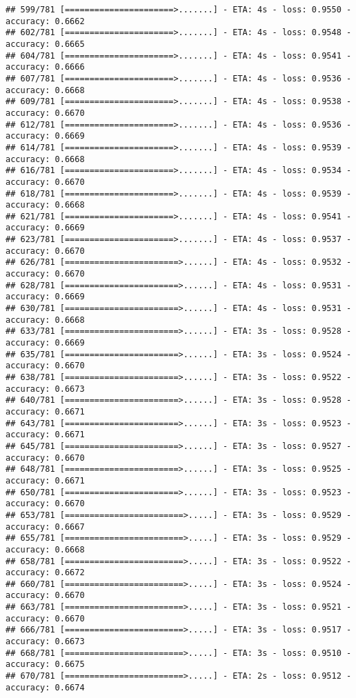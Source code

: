 \documentclass[
]{article}
\begin{document}
\begin{verbatim}
## 599/781 [======================>.......] - ETA: 4s - loss: 0.9550 - accuracy: 0.6662
## 602/781 [======================>.......] - ETA: 4s - loss: 0.9548 - accuracy: 0.6665
## 604/781 [======================>.......] - ETA: 4s - loss: 0.9541 - accuracy: 0.6666
## 607/781 [======================>.......] - ETA: 4s - loss: 0.9536 - accuracy: 0.6668
## 609/781 [======================>.......] - ETA: 4s - loss: 0.9538 - accuracy: 0.6670
## 612/781 [======================>.......] - ETA: 4s - loss: 0.9536 - accuracy: 0.6669
## 614/781 [======================>.......] - ETA: 4s - loss: 0.9539 - accuracy: 0.6668
## 616/781 [======================>.......] - ETA: 4s - loss: 0.9534 - accuracy: 0.6670
## 618/781 [======================>.......] - ETA: 4s - loss: 0.9539 - accuracy: 0.6668
## 621/781 [======================>.......] - ETA: 4s - loss: 0.9541 - accuracy: 0.6669
## 623/781 [======================>.......] - ETA: 4s - loss: 0.9537 - accuracy: 0.6670
## 626/781 [=======================>......] - ETA: 4s - loss: 0.9532 - accuracy: 0.6670
## 628/781 [=======================>......] - ETA: 4s - loss: 0.9531 - accuracy: 0.6669
## 630/781 [=======================>......] - ETA: 4s - loss: 0.9531 - accuracy: 0.6668
## 633/781 [=======================>......] - ETA: 3s - loss: 0.9528 - accuracy: 0.6669
## 635/781 [=======================>......] - ETA: 3s - loss: 0.9524 - accuracy: 0.6670
## 638/781 [=======================>......] - ETA: 3s - loss: 0.9522 - accuracy: 0.6673
## 640/781 [=======================>......] - ETA: 3s - loss: 0.9528 - accuracy: 0.6671
## 643/781 [=======================>......] - ETA: 3s - loss: 0.9523 - accuracy: 0.6671
## 645/781 [=======================>......] - ETA: 3s - loss: 0.9527 - accuracy: 0.6670
## 648/781 [=======================>......] - ETA: 3s - loss: 0.9525 - accuracy: 0.6671
## 650/781 [=======================>......] - ETA: 3s - loss: 0.9523 - accuracy: 0.6670
## 653/781 [========================>.....] - ETA: 3s - loss: 0.9529 - accuracy: 0.6667
## 655/781 [========================>.....] - ETA: 3s - loss: 0.9529 - accuracy: 0.6668
## 658/781 [========================>.....] - ETA: 3s - loss: 0.9522 - accuracy: 0.6672
## 660/781 [========================>.....] - ETA: 3s - loss: 0.9524 - accuracy: 0.6670
## 663/781 [========================>.....] - ETA: 3s - loss: 0.9521 - accuracy: 0.6670
## 666/781 [========================>.....] - ETA: 3s - loss: 0.9517 - accuracy: 0.6673
## 668/781 [========================>.....] - ETA: 3s - loss: 0.9510 - accuracy: 0.6675
## 670/781 [========================>.....] - ETA: 2s - loss: 0.9512 - accuracy: 0.6674

\end{verbatim}
\end{document}
